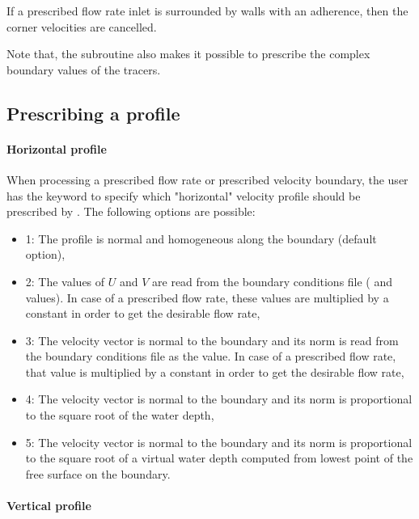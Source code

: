 If a prescribed flow rate inlet is surrounded by walls with an adherence, then
the corner velocities are cancelled.

Note that, the  subroutine also makes it possible to prescribe
the complex boundary values of the tracers.

\subsection{Prescribing a profile}


\paragraph{Horizontal profile}

When processing a prescribed flow rate or prescribed velocity boundary, the
user has the keyword  to specify which "horizontal"
velocity profile should be prescribed by . The following options are
possible:

\begin{itemize}
\item 1: The profile is normal and homogeneous along the boundary (default
option),

\item 2: The values of $U$ and $V$ are read from the boundary
conditions file ( and  values).
In case of a prescribed flow rate, these values are multiplied by a constant
in order to get the desirable flow rate,

\item 3: The velocity vector is normal to the boundary and its norm is read
from the boundary conditions file as the  value. In case of a
prescribed flow rate, that value is multiplied by a constant in order to get
the desirable flow rate,

\item 4: The velocity vector is normal to the boundary and its norm is
proportional to the square root of the water depth,

\item 5: The velocity vector is normal to the boundary and its norm is
proportional to the square root of a virtual water depth computed from lowest
point of the free surface on the boundary.
\end{itemize}

\paragraph{ Vertical profile}

